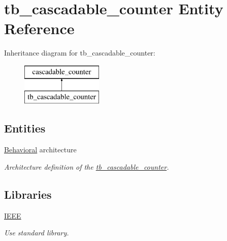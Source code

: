 \hypertarget{classtb__cascadable__counter}{}\section{tb\+\_\+cascadable\+\_\+counter Entity Reference}
\label{classtb__cascadable__counter}
Inheritance diagram for tb\+\_\+cascadable\+\_\+counter\+:\begin{figure}[H]
\begin{center}
\leavevmode
\includegraphics[height=2.000000cm]{classtb__cascadable__counter}
\end{center}
\end{figure}
\subsection*{Entities}
\begin{DoxyCompactItemize}
\item 
\hyperlink{classtb__cascadable__counter_1_1_behavioral}{Behavioral} architecture
\begin{DoxyCompactList}\small\item\em Architecture definition of the \hyperlink{classtb__cascadable__counter}{tb\+\_\+cascadable\+\_\+counter}. \end{DoxyCompactList}\end{DoxyCompactItemize}
\subsection*{Libraries}
 \begin{DoxyCompactItemize}
\item 
\hyperlink{classtb__cascadable__counter_ae4f03c286607f3181e16b9aa12d0c6d4}{I\+E\+EE} \hypertarget{classtb__cascadable__counter_ae4f03c286607f3181e16b9aa12d0c6d4}{}\label{classtb__cascadable__counter_ae4f03c286607f3181e16b9aa12d0c6d4}

\begin{DoxyCompactList}\small\item\em Use standard library. \end{DoxyCompactList}\end{DoxyCompactItemize}
